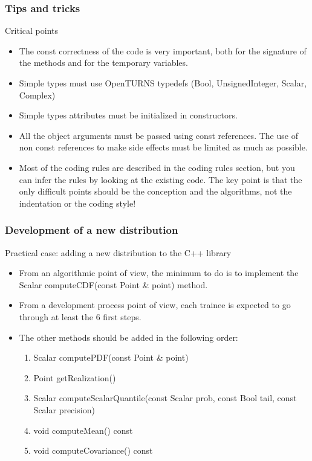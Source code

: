 \documentclass[8pt]{beamer}
\begin{document}
\begin{frame}
  \frametitle{Tips and tricks}
  \begin{block}{Critical points}
    \begin{itemize}
\item The const correctness of the code is very important, both for the signature of the methods and for the temporary variables.
    \item Simple types must use OpenTURNS typedefs (Bool, UnsignedInteger, Scalar, Complex)
    \item Simple types attributes must be initialized in constructors.
      \item All the object arguments must be passed using const references. The use of non const references to make side effects must be limited as much as possible.
      \item Most of the coding rules are described in the coding rules section, but you can infer the rules by looking at the existing code. \alert{The key point is that the only difficult points should be the conception and the algorithms, not the indentation or the coding style!}
    \end{itemize}
  \end{block}
\end{frame}

\begin{frame}
  \frametitle{Development of a new distribution}
  \begin{block}{Practical case: adding a new distribution to the C++ library}
    \begin{itemize}
    \item From an algorithmic point of view, the minimum to do is to implement the {\ttfamily Scalar computeCDF(const Point \& point)} method.
    \item From a development process point of view, each trainee is expected to go through at least the 6 first steps.
    \item The other methods should be added in the following order:
      \begin{enumerate}
      \item {\ttfamily Scalar computePDF(const Point \& point)}
      \item {\ttfamily Point getRealization()}
      \item {\ttfamily Scalar computeScalarQuantile(const Scalar prob, const Bool tail, const Scalar precision)}
      \item {\ttfamily void computeMean() const}
      \item {\ttfamily void computeCovariance() const}
      \end{enumerate}
    \end{itemize}
  \end{block}
\end{frame}
\end{document}
